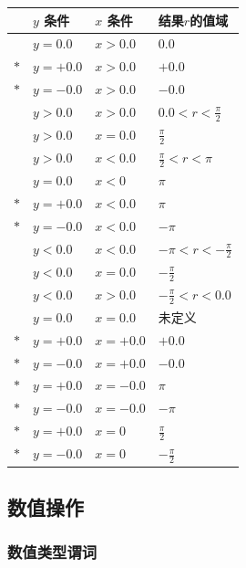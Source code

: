 \begin{center}
\begin{tabular}{clll}
& $y$ 条件 & $x$ 条件 & 结果$r$的值域\\\hline
& $y = 0.0$ & $x > 0.0$ & $0.0$\\
$\ast$ & $y = +0.0$  & $x > 0.0$ & $+0.0$\\
$\ast$ & $y = -0.0$ & $x > 0.0$ & $-0.0$\\
& $y > 0.0$ & $x > 0.0$ & $0.0 < r < \frac{\pi}{2}$\\
& $y > 0.0$ & $x = 0.0$ & $\frac{\pi}{2}$\\
& $y > 0.0$ & $x < 0.0$ & $\frac{\pi}{2} < r < \pi$\\
& $y = 0.0$ & $x < 0$ & $\pi$\\
$\ast$ & $y = +0.0$ & $x < 0.0$ & $\pi$\\
$\ast$ & $y = -0.0$ & $x < 0.0$ & $-\pi$\\
&$y < 0.0$ & $x < 0.0$ & $-\pi< r< -\frac{\pi}{2}$\\
&$y < 0.0$ & $x = 0.0$ & $-\frac{\pi}{2}$\\
&$y < 0.0$ & $x > 0.0$ & $-\frac{\pi}{2} < r< 0.0$\\
&$y = 0.0$ & $x = 0.0$ & 未定义\\
$\ast$& $y = +0.0$ & $x = +0.0$ & $+0.0$\\
$\ast$& $y = -0.0$ & $x = +0.0$& $-0.0$\\
$\ast$& $y = +0.0$ & $x = -0.0$ & $\pi$\\
$\ast$& $y = -0.0$ & $x = -0.0$ & $-\pi$\\
$\ast$& $y = +0.0$ & $x = 0$ & $\frac{\pi}{2}$\\
$\ast$& $y = -0.0$ & $x = 0$    & $-\frac{\pi}{2}$
\end{tabular}
\end{center}

\subsection{数值操作}

\subsubsection{数值类型谓词}

